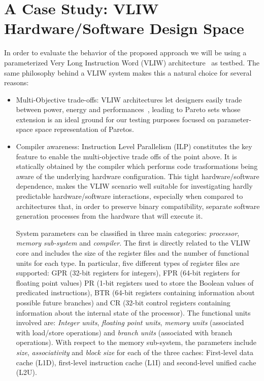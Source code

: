 \section{A Case Study: VLIW Hardware/Software Design Space}
\label{sec:ee}
In order to evaluate the behavior of the proposed approach
we will be using a parameterized Very Long Instruction
Word (VLIW) architecture~\cite{kathail_tr00} as testbed. The same philosophy
behind a VLIW system makes this a natural choice for several reasons:
\begin{itemize}
\item{Multi-Objective trade-offs}: VLIW architectures let designers
easily trade between power, energy and performances~\cite{}, leading
to Pareto sets whose extension is an ideal ground for our testing
purposes focused on parameter-space space representation of Paretos.
\item{Compiler awareness}: Instruction Level Parallelism (ILP)
constitutes the key feature to enable the multi-objective trade offs
of the point above. It is statically obtained by the compiler which
performs code trasformations being aware of the underlying hardware
configuration.  This tight hardware/software dependence, makes the
VLIW scenario well suitable for investigating hardly predictable
hardware/software interactions, especially when compared to
architectures that, in order to preserve binary compatibility,
separate software generation processes from the hardware that
will execute it.

System parameters can be classified in three main categories:
\emph{processor}, \emph{memory sub-system} and \emph{compiler}. 
The first is directly related to the VLIW core and includes the size
of the register files and the number of functional
units for each type. In particular, five different types of register
files are supported:
GPR (32-bit registers for integers), FPR (64-bit registers for
floating point values) PR (1-bit registers used to store the Boolean
values of predicated instructions), BTR (64-bit registers containing
information about possible future branches) and CR (32-bit control
registers containing information about the internal state of the
processor). The functional units involved are: \emph{Integer units},
\emph{floating point units}, \emph{memory units} (associated with
load/store operations) and \emph{branch units} (associated with branch
operations). With respect to the memory sub-system, the parameters
include \emph{size}, \emph{associativity} and
\emph{block size} for each of the three caches: First-level data cache
(L1D), first-level instruction cache (L1I) and second-level unified
cache (L2U).


\end{itemize}
